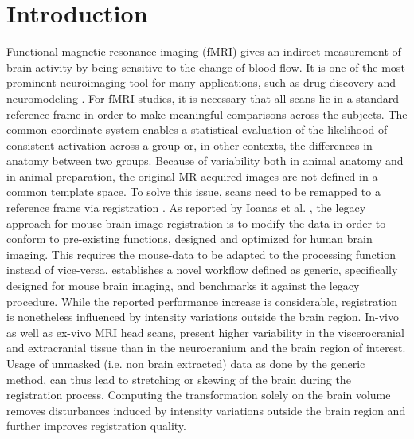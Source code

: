 \section{Introduction}
Functional magnetic resonance imaging (fMRI) gives an indirect measurement of brain activity by being sensitive to the change of blood flow.
It is one of the most prominent neuroimaging tool for many applications, such as drug discovery \cite{borsook_role_2006} and neuromodeling \cite{friston_dynamic_2003}.
For fMRI studies, it is necessary that all scans lie in a standard reference frame in order to make meaningful comparisons across the subjects.
The common coordinate system enables a statistical evaluation of the likelihood of consistent activation across a group or, in other contexts, the differences in anatomy between two groups.
Because of variability both in animal anatomy and in animal preparation, the original MR acquired images are not defined in a common template space.
To solve this issue, scans need to be remapped to a reference frame via registration \cite{maintz_overview_nodate, sotiras_deformable_2013}.
As reported by Ioanas et al. \cite{ioanas_optimized_2019}, the legacy approach for mouse-brain image registration is to modify the data in order to conform to pre-existing functions, designed and optimized for human brain imaging.
This requires the mouse-data to be adapted to the processing function instead of vice-versa.
\cite{ioanas_optimized_2019} establishes a novel workflow defined as generic, specifically designed for mouse brain imaging, and benchmarks it against the legacy procedure.
While the reported performance increase is considerable, registration is nonetheless influenced by intensity variations outside the brain region.
In-vivo as well as ex-vivo MRI head scans, present higher variability in the viscerocranial and extracranial tissue than in the neurocranium and the brain region of interest.
Usage of unmasked (i.e. non brain extracted) data as done by the generic method, can thus lead to stretching or skewing of the brain during the registration process.
Computing the transformation solely on the brain volume removes disturbances induced by intensity variations outside the brain region and further improves registration quality.

